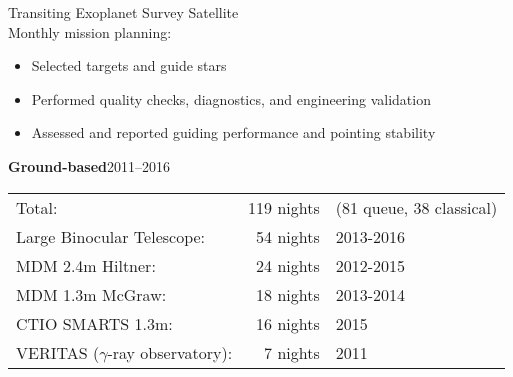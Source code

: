 \documentclass[letterpaper,11pt]{article}
\begin{document}
Transiting Exoplanet Survey Satellite\\
\indent Monthly mission planning:
\begin{itemize}[nosep,label=\textbullet]
\item Selected targets and guide stars
\item Performed quality checks, diagnostics, and engineering validation
\item Assessed and reported guiding performance and pointing stability
\end{itemize}
\textbf{Ground-based}\hfill 2011--2016\\
\begin{tabular}[t]{lrl}
Total:&                                        119 nights& (81 queue, 38 classical)\\
Large Binocular Telescope:&       54 nights& 2013-2016\\
MDM 2.4m Hiltner:&                   24 nights& 2012-2015\\
MDM 1.3m McGraw: &               18 nights& 2013-2014\\
CTIO SMARTS 1.3m: &              16 nights& 2015\\
VERITAS ($\gamma$-ray observatory): &   7 nights& 2011   \\ 
\end{tabular}
\\
\\
\end{document}
